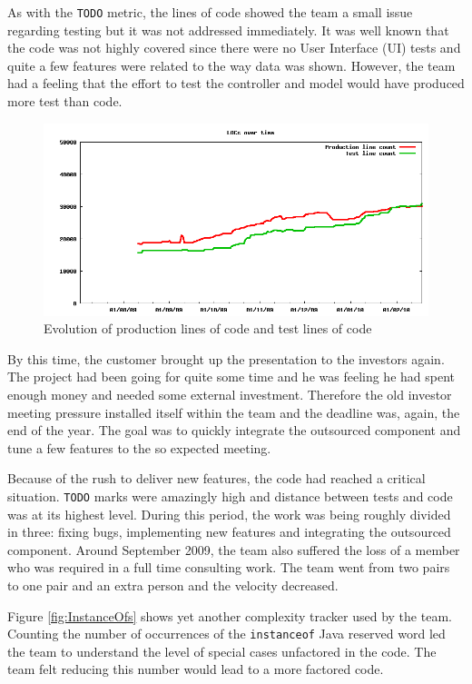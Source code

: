\documentclass[lnbip]{svmultln}
\begin{document}
As with the \texttt{TODO} metric, the lines of code showed the team a
small issue regarding testing but it was not addressed immediately. It
was well known that the code was not highly covered since there were
no User Interface (UI) tests and quite a few features were related to
the way data was shown. However, the team had a feeling that the
effort to test the controller and model would have produced more test
than code.

\begin{figure}[hbt]
  \centerline{
    \includegraphics[width=120mm]{LOCs}
  }
  \caption{Evolution of production lines of code and test lines of
    code}
  \label{fig:LOCs}
\end{figure}

By this time, the customer brought up the presentation to the
investors again. The project had been going for quite some time and he
was feeling he had spent enough money and needed some external
investment. Therefore the old investor meeting pressure installed
itself within the team and the deadline was, again, the end of the
year. The goal was to quickly integrate the outsourced component and
tune a few features to the so expected meeting.

Because of the rush to deliver new features, the code had reached a
critical situation. \texttt{TODO} marks were amazingly high and
distance between tests and code was at its highest level.  During this
period, the work was being roughly divided in three: fixing bugs,
implementing new features and integrating the outsourced
component. Around September 2009, the team also suffered the loss of a
member who was required in a full time consulting work. The team went
from two pairs to one pair and an extra person and the velocity
decreased.

Figure \ref{fig:InstanceOfs} shows yet another complexity tracker used
by the team. Counting the number of occurrences of the
\texttt{instanceof} Java reserved word led the team to understand the
level of special cases unfactored in the code. The team felt reducing
this number would lead to a more factored code.
\end{document}

